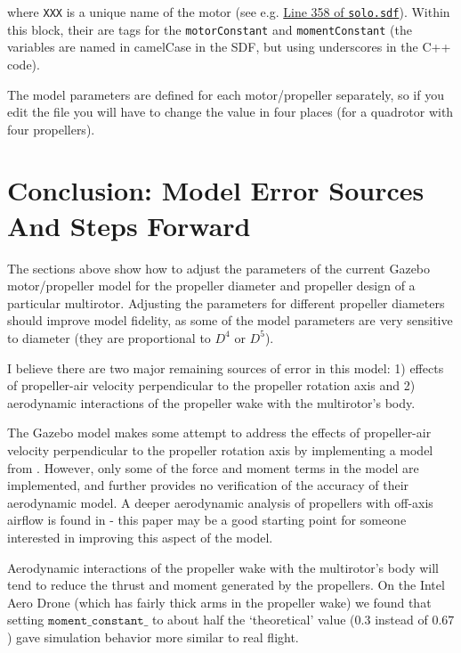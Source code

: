 \documentclass[12pt]{article}
\begin{document}
where \texttt{XXX} is a unique name of the motor (see e.g. \href{https://github.com/PX4/sitl_gazebo/blob/d08eb5b22d3edfb7a740c883b06f895a173b5519/models/solo/solo.sdf#L358}{Line 358 of \texttt{solo.sdf}}). Within this block, their are tags for the \texttt{motorConstant} and \texttt{momentConstant} (the variables are named in camelCase in the SDF, but using underscores in the C++ code).

The model parameters are defined for each motor/propeller separately, so if you edit the file you will have to change the value in four places (for a quadrotor with four propellers).


\section{Conclusion: Model Error Sources And Steps Forward} \label{sec:conclusion}

The sections above show how to adjust the parameters of the current Gazebo motor/propeller model for the propeller diameter and propeller design of a particular multirotor. Adjusting the parameters for different propeller diameters should improve model fidelity, as some of the model parameters are very sensitive to diameter (they are proportional to $D^4$ or $D^5$).

I believe there are two major remaining sources of error in this model: 1) effects of propeller-air velocity perpendicular to the propeller rotation axis and 2) aerodynamic interactions of the propeller wake with the multirotor's body.

The Gazebo model makes some attempt to address the effects of propeller-air velocity perpendicular to the propeller rotation axis by implementing a model from \cite{martin:hal-00422423}. However, only some of the force and moment terms in the model are implemented, and further \cite{martin:hal-00422423} provides no verification of the accuracy of their aerodynamic model. A deeper aerodynamic analysis of propellers with off-axis airflow is found in \cite{2016arXiv160100733B} - this paper may be a good starting point for someone interested in improving this aspect of the model.

Aerodynamic interactions of the propeller wake with the multirotor's body will tend to reduce the thrust and moment generated by the propellers. On the Intel Aero Drone (which has fairly thick arms in the propeller wake) we found that setting $\mathtt{moment\_constant\_}$ to about half the `theoretical' value ($0.3$ instead of $0.67$) gave simulation behavior more similar to real flight.


\printbibliography
\end{document}
